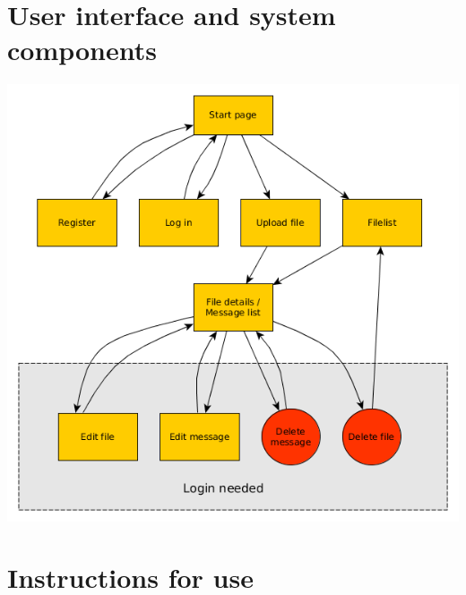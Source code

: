 \documentclass[10pt,a4paper]{article}
\begin{document}
\section{User interface and system components}
\includegraphics[scale=0.7]{diagrams/pageflow.png}

\section{Instructions for use}


\section{}
\end{document}

